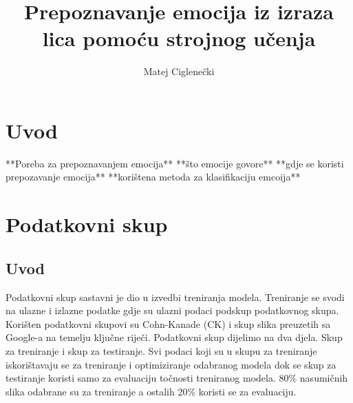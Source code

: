 \documentclass[times, utf8, zavrsni,numeric]{fer}
\begin{document}

\title{Prepoznavanje emocija iz izraza lica pomoću strojnog učenja}

\author{Matej Ciglenečki}

\maketitle

\izvornik

\zahvala{}

\tableofcontents

\chapter{Uvod}
**Poreba za prepoznavanjem emocija**
**što emocije govore**
**gdje se koristi prepozavanje emocija**
**korištena metoda za klasifikaciju emcoija**


%



\chapter{Podatkovni skup}
\section{Uvod}
Podatkovni skup sastavni je dio u izvedbi treniranja modela. Treniranje se svodi na ulazne i izlazne podatke gdje su ulazni podaci podskup podatkovnog skupa. Korišten podatkovni skupovi su Cohn-Kanade (CK) i skup slika preuzetih sa Google-a na temelju ključne riječi. Podatkovni skup dijelimo na dva djela. Skup za treniranje i skup za testiranje. Svi podaci koji su u skupu za treniranje iskorištavaju se za treniranje i optimiziranje odabranog modela dok se skup za testiranje koristi samo za evaluaciju točnosti treniranog modela. 80\% nasumičnih slika odabrane su za treniranje a ostalih 20\% koristi se za evaluaciju.
\end{document}
